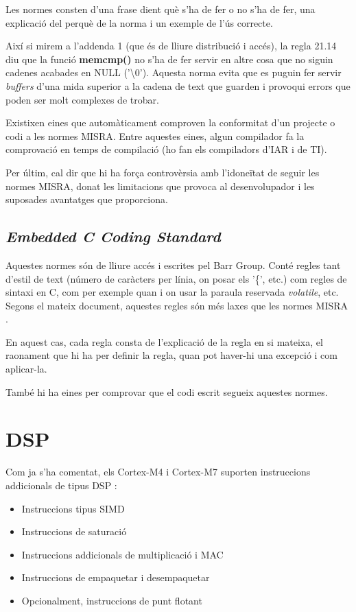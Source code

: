 Les normes consten d'una frase dient què s'ha de fer o no s'ha de fer, una explicació del perquè de la norma i un exemple de l'ús correcte.

Així si mirem a l'addenda 1 \cite[4]{MISRAAmend} (que és de lliure distribució i accés), la regla 21.14 diu que la funció {\bf memcmp()} no s'ha de fer servir en altre cosa que no siguin cadenes acabades en NULL ('\textbackslash 0'). Aquesta norma evita que es puguin fer servir {\em buffers} d'una mida superior a la cadena de text que guarden i provoqui errors que poden ser molt complexes de trobar.

Existixen eines que automàticament comproven la conformitat d'un projecte o codi a les normes MISRA. Entre aquestes eines, algun compilador fa la comprovació en temps de compilació (ho fan els compiladors d'IAR i de TI).

Per últim, cal dir que hi ha força controvèrsia amb l'idoneïtat de seguir les normes MISRA, donat les limitacions que provoca al desenvolupador i les suposades avantatges que proporciona.

\section{\em Embedded C Coding Standard}
Aquestes normes són de lliure accés i escrites pel Barr Group. Conté regles tant d'estil de text (número de caràcters per línia, on posar els '\{', etc.) com regles de sintaxi en C, com per exemple quan i on usar la paraula reservada {\em volatile}, etc. Segons el mateix document, aquestes regles són més laxes que les normes MISRA \cite{BARRGuidelines}.

En aquest cas, cada regla consta de l'explicació de la regla en si mateixa, el raonament que hi ha per definir la regla, quan pot haver-hi una excepció i com aplicar-la.

També hi ha eines per comprovar que el codi escrit segueix aquestes normes.


\chapter{DSP}
\label{ch:DSP}
Com ja s'ha comentat, els Cortex-M4 i Cortex-M7 suporten instruccions addicionals de tipus \gls{DSP} \cite[173]{GuideCortexM3M4}\cite[255]{DesignersGuide}:
\begin{itemize}
 \item Instruccions tipus \gls{SIMD}
 \item Instruccions de saturació
 \item Instruccions addicionals de multiplicació i \gls{MAC}
 \item Instruccions de empaquetar i desempaquetar
 \item Opcionalment, instruccions de punt flotant
\end{itemize}

